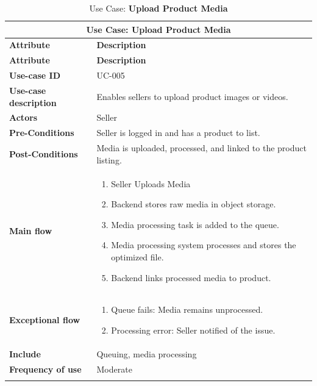 \documentclass[12pt]{report}
\begin{document}
\begin{appendices}
	\begin{longtable}[H]{|l|p{9cm}||}
		\hline
		\multicolumn{2}{|c||}{\textbf{Use Case: Upload Product Media}}                                        \\
		\hline
		\textbf{Attribute}            & \textbf{Description}                                                  \\
		\hline
		\endfirsthead
		\hline
		\textbf{Attribute}            & \textbf{Description}                                                  \\
		\hline
		\endhead
		\textbf{Use-case ID}          & UC-005                                                                \\
		\hline
		\textbf{Use-case description} & Enables sellers to upload product images or videos.                   \\
		\hline
		\textbf{Actors}               & Seller                                                                \\
		\hline
		\textbf{Pre-Conditions}       & Seller is logged in and has a product to list.                        \\
		\hline
		\textbf{Post-Conditions}      & Media is uploaded, processed, and linked to the product listing.      \\
		\hline
		\textbf{Main flow}            & \begin{enumerate}
			                                \item Seller Uploads Media
			                                \item Backend stores raw media in object storage.
			                                \item Media processing task is added to the queue.
			                                \item Media processing system processes and stores the optimized file.
			                                \item Backend links processed media to product.
		                                \end{enumerate} \\
		\hline
		\textbf{Exceptional flow}     & \begin{enumerate}
			                                \item Queue fails: Media remains unprocessed.
			                                \item Processing error: Seller notified of the issue.
		                                \end{enumerate}                  \\
		\hline
		\textbf{Include}              & Queuing, media processing                                             \\
		\hline
		\textbf{Frequency of use}     & Moderate                                                              \\
		\hline
		\hline
		\caption{Use Case: \textbf{Upload Product Media}}\label{tab:tableUploadMedia}
	\end{longtable}


\end{appendices}
\end{document}
